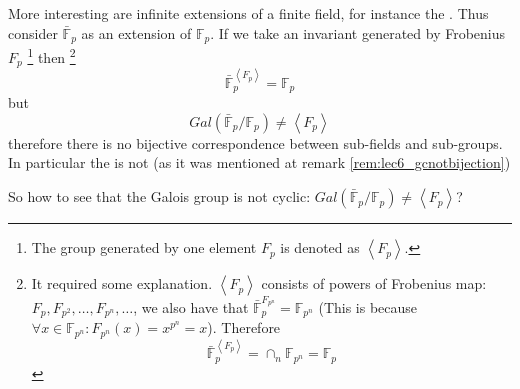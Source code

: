 More interesting are infinite extensions of a finite field, for
instance the .
Thus consider $\bar{\mathbb{F}}_p$ as an extension of
$\mathbb{F}_p$. If we take an invariant generated by Frobenius $F_p$
\footnote {
  The group generated by one element $F_p$ is denoted as $\left<F_p\right>$.
}
then
\footnote{
  It required some explanation. $\left<F_p\right>$ consists of powers
  of Frobenius map: $F_p, F_{p^2}, \dots, F_{p^n}, \dots$, we also
  have that $\bar{\mathbb{F}}_p^{F_{p^n}} = \mathbb{F}_{p^n}$
  (This is because $\forall x \in \mathbb{F}_{p^n}:
  F_{p^n}\left(x\right) = x^{p^n} = x$). Therefore
  \[
  \bar{\mathbb{F}}_p^{\left<F_p\right>} =
  \cap_n \mathbb{F}_{p^n} = \mathbb{F}_p
  \]
}
\[
\bar{\mathbb{F}}_p^{\left<F_p\right>} = \mathbb{F}_p
\]
but
\[
Gal\left(\bar{\mathbb{F}}_p/\mathbb{F}_p\right) \ne
\left<F_p\right>
\]
therefore there is no bijective correspondence between sub-fields and
sub-groups. In particular the  is
not  (as it was mentioned at remark
\ref{rem:lec6_gcnotbijection})

So how to see that the Galois group is not cyclic:
$Gal\left(\bar{\mathbb{F}}_p/\mathbb{F}_p\right) \ne
\left<F_p\right>$?

